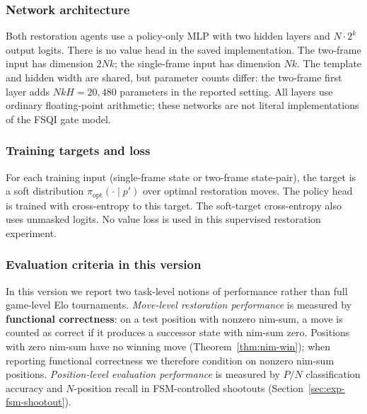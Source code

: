 \documentclass[11pt]{article}
\theoremstyle{plain}
\theoremstyle{definition}
\theoremstyle{remark}
\numberwithin{equation}{section}
\begin{document}
\subsubsection{Network architecture}
Both restoration agents use a policy-only MLP with two hidden layers and $N\cdot2^k$ output logits. There is no value head in the saved implementation. The two-frame input has dimension $2Nk$; the single-frame input has dimension $Nk$. The template and hidden width are shared, but parameter counts differ: the two-frame first layer adds $NkH=20{,}480$ parameters in the reported setting. All layers use ordinary floating-point arithmetic; these networks are not literal implementations of the FSQI gate model.

\begin{table}[h!]
\centering
{}
\caption{Neural network architecture used in the experiments. $H$ denotes the hidden width (a fixed hyperparameter).}
\label{table:arch}
\end{table}

\subsubsection{Training targets and loss}
For each training input (single-frame state or two-frame state-pair), the target is a soft distribution $\pi_{\mathrm{opt}}(\cdot\mid p')$ over optimal restoration moves.
The policy head is trained with cross-entropy to this target.
The soft-target cross-entropy also uses unmasked logits. No value loss is used in this supervised restoration experiment.

\subsubsection{Evaluation criteria in this version}
In this version we report two task-level notions of performance rather than full game-level Elo tournaments.
\emph{Move-level restoration performance} is measured by \textbf{functional correctness}: on a test position with nonzero nim-sum, a move is counted as correct if it produces a successor state with nim-sum zero.
Positions with zero nim-sum have no winning move (Theorem~\ref{thm:nim-win}); when reporting functional correctness we therefore condition on nonzero nim-sum positions.
\emph{Position-level evaluation performance} is measured by $P/N$ classification accuracy and $N$-position recall in FSM-controlled shootouts (Section~\ref{sec:exp-fsm-shootout}).
\end{document}
